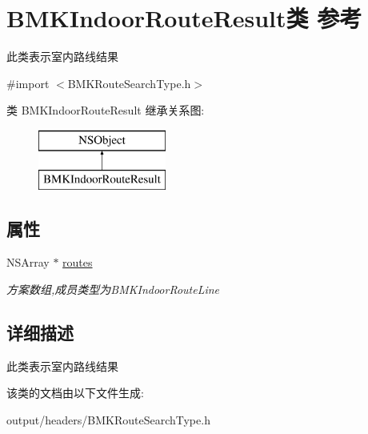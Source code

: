 \hypertarget{interface_b_m_k_indoor_route_result}{}\section{B\+M\+K\+Indoor\+Route\+Result类 参考}
\label{interface_b_m_k_indoor_route_result}


此类表示室内路线结果  




{\ttfamily \#import $<$B\+M\+K\+Route\+Search\+Type.\+h$>$}

类 B\+M\+K\+Indoor\+Route\+Result 继承关系图\+:\begin{figure}[H]
\begin{center}
\leavevmode
\includegraphics[height=2.000000cm]{interface_b_m_k_indoor_route_result}
\end{center}
\end{figure}
\subsection*{属性}
\begin{DoxyCompactItemize}
\item 
\hypertarget{interface_b_m_k_indoor_route_result_a8fa81e855b03e0e381391937cc8d228d}{}N\+S\+Array $\ast$ \hyperlink{interface_b_m_k_indoor_route_result_a8fa81e855b03e0e381391937cc8d228d}{routes}\label{interface_b_m_k_indoor_route_result_a8fa81e855b03e0e381391937cc8d228d}

\begin{DoxyCompactList}\small\item\em 方案数组,成员类型为\+B\+M\+K\+Indoor\+Route\+Line \end{DoxyCompactList}\end{DoxyCompactItemize}


\subsection{详细描述}
此类表示室内路线结果 

该类的文档由以下文件生成\+:\begin{DoxyCompactItemize}
\item 
output/headers/B\+M\+K\+Route\+Search\+Type.\+h\end{DoxyCompactItemize}
